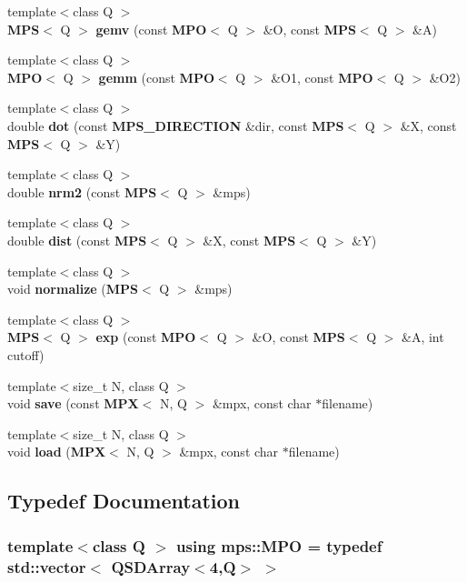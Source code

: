 \begin{DoxyCompactItemize}
{\footnotesize template$<$class Q $>$ }\\{\bf M\-P\-S}$<$ Q $>$ {\bf gemv} (const {\bf M\-P\-O}$<$ Q $>$ \&O, const {\bf M\-P\-S}$<$ Q $>$ \&A)
\item 
{\footnotesize template$<$class Q $>$ }\\{\bf M\-P\-O}$<$ Q $>$ {\bf gemm} (const {\bf M\-P\-O}$<$ Q $>$ \&O1, const {\bf M\-P\-O}$<$ Q $>$ \&O2)
\item 
{\footnotesize template$<$class Q $>$ }\\double {\bf dot} (const {\bf M\-P\-S\-\_\-\-D\-I\-R\-E\-C\-T\-I\-O\-N} \&dir, const {\bf M\-P\-S}$<$ Q $>$ \&X, const {\bf M\-P\-S}$<$ Q $>$ \&Y)
\item 
{\footnotesize template$<$class Q $>$ }\\double {\bf nrm2} (const {\bf M\-P\-S}$<$ Q $>$ \&mps)
\item 
{\footnotesize template$<$class Q $>$ }\\double {\bf dist} (const {\bf M\-P\-S}$<$ Q $>$ \&X, const {\bf M\-P\-S}$<$ Q $>$ \&Y)
\item 
{\footnotesize template$<$class Q $>$ }\\void {\bf normalize} ({\bf M\-P\-S}$<$ Q $>$ \&mps)
\item 
{\footnotesize template$<$class Q $>$ }\\{\bf M\-P\-S}$<$ Q $>$ {\bf exp} (const {\bf M\-P\-O}$<$ Q $>$ \&O, const {\bf M\-P\-S}$<$ Q $>$ \&A, int cutoff)
\item 
{\footnotesize template$<$size\-\_\-t N, class Q $>$ }\\void {\bf save} (const {\bf M\-P\-X}$<$ N, Q $>$ \&mpx, const char $\ast$filename)
\item 
{\footnotesize template$<$size\-\_\-t N, class Q $>$ }\\void {\bf load} ({\bf M\-P\-X}$<$ N, Q $>$ \&mpx, const char $\ast$filename)
\end{DoxyCompactItemize}


\subsection{Typedef Documentation}
\subsubsection[{M\-P\-O}]{\setlength{\rightskip}{0pt plus 5cm}template$<$class Q $>$ using {\bf mps\-::\-M\-P\-O} = typedef std\-::vector$<$ {\bf Q\-S\-D\-Array}$<$4,Q$>$ $>$}\label{d1/d7b/namespacemps_abe11c169d93a4e72b657b166debe9d38}


